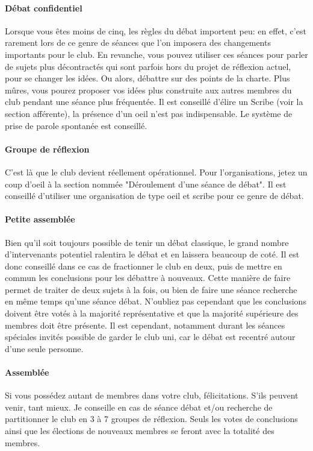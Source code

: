\documentclass[a4paper,11pt]{article}
\begin{document}
\paragraph{Débat confidentiel}
Lorsque vous êtes moins de cinq, les règles du débat importent peu: en effet, c'est rarement lors de ce genre de séances que l'on imposera des changements importants pour le club. En revanche, vous pouvez utiliser ces séances pour parler de sujets plus décontractés qui sont parfois hors du projet de réflexion actuel, pour se changer les idées. Ou alors, débattre sur des points de la charte. Plus mûres, vous pourez proposer vos idées plus construite aux autres membres du club pendant une séance plus fréquentée. Il est conseillé d'élire un Scribe (voir la section afférente), la présence d'un oeil n'est pas indispensable. Le système de prise de parole spontanée est conseillé.

\paragraph{Groupe de réflexion}
C'est là que le club devient réellement opérationnel. Pour l'organisations, jetez un coup d'oeil à la section nommée "Déroulement d'une séance de débat". Il est conseillé d'utiliser une organisation de type oeil et scribe pour ce genre de débat. 

\paragraph{Petite assemblée}
Bien qu'il soit toujours possible de tenir un débat classique, le grand nombre d'intervenants potentiel ralentira le débat et en laissera beaucoup de coté. Il est donc conseillé dans ce cas de fractionner le club en deux, puis de mettre en commun les conclusions pour les débattre à nouveaux. Cette manière de faire permet de traiter de deux sujets à la fois, ou bien de faire une séance recherche en même temps qu'une séance débat. N'oubliez pas cependant que les conclusions doivent être votés à la majorité représentative et que la majorité supérieure des membres doit être présente. Il est cependant, notamment durant les séances spéciales invités possible de garder le club uni, car le débat est recentré autour d'une seule personne.

\paragraph{Assemblée}
Si vous possédez autant de membres dans votre club, félicitations. S'ils peuvent venir, tant mieux. Je conseille en cas de séance débat et/ou recherche de partitionner le club en 3 à 7 groupes de réflexion.
Seuls les votes de conclusions ainsi que les élections de nouveaux membres se feront avec la totalité des membres.
\end{document}
